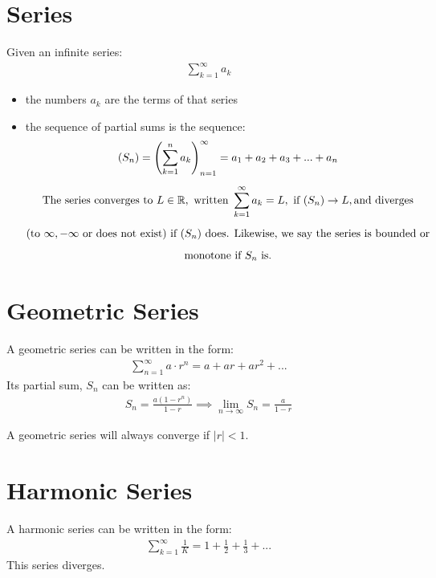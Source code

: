 \documentclass[12pt, a4paper]{article}
\newcommand{\real}{\mathbb{R}}
\newcommand{\lp}{\left(}
\newcommand{\rp}{\right)}
\begin{document}
\section{Series}

Given an infinite series:
\begin{gather*}
  \sum_{k = 1}^{\infty} a_k
\end{gather*}

\begin{itemize}
  \item the numbers $a_k$ are the terms of that series

  \item the sequence of partial sums is the sequence: 
    \begin{gather*}
      (S_n) = \lp \sum_{k = 1}^{n} a_k \rp_{n = 1}^{\infty}
      = a_1 + a_2 + a_3 + ... + a_n \\[5pt]
      \text{The series converges to } L \in \real, \text{ written }
      \sum_{k = 1}^{\infty} a_k = L, \text{ if } (S_n) \rightarrow L,
      \text{and diverges} \\[5pt]
      \text{(to $ \infty, -\infty $ or}
      \text { does not exist) if $(S_n)$ does. Likewise, we say the
      series is bounded or} \\[5pt]
      \text{monotone if $S_n$ is.} 
    \end{gather*}
\end{itemize}

\section{Geometric Series}
A geometric series can be written in the form:
\begin{gather*}
  \sum_{n = 1}^{\infty} a \cdot r^n = a + ar + ar^2 + ...
\end{gather*}
Its partial sum, $S_n$ can be written as:
\begin{gather*}
  S_n = \frac{a(1 - r^n)}{1 - r} \implies
  \lim_{n \to \infty} S_n = \frac{a}{1 - r}
\end{gather*}

A geometric series will always converge if $|r| < 1$.


\section{Harmonic Series}
A harmonic series can be written in the form:
\begin{gather*}
  \sum_{k = 1}^{\infty} \frac{1}{K} = 1 + \frac{1}{2} + \frac{1}{3} + ...
\end{gather*}
This series diverges.
\end{document}
